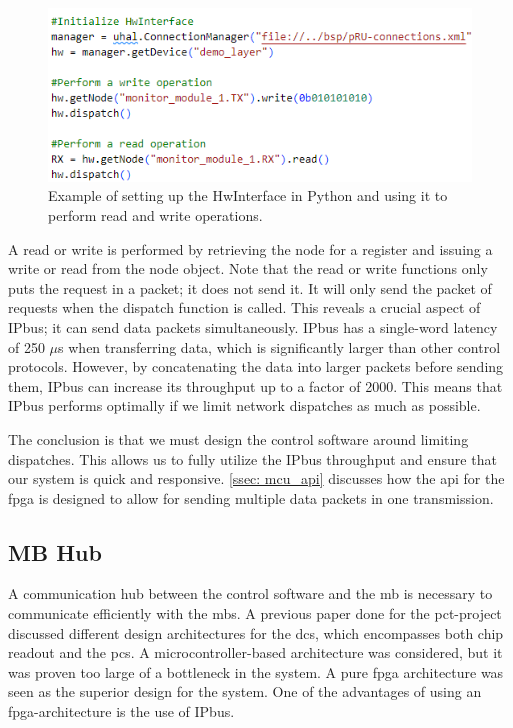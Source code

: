 \documentclass[main.tex]{subfiles}
\begin{document}
\begin{figure}[!htpb]
    \centering
    \includegraphics[scale=0.8]{images/HwInterface_example.png}
    \caption{Example of setting up the HwInterface in Python and using it to perform read and write operations.}
    \label{fig: hw_example}
\end{figure}
\FloatBarrier

A read or write is performed by retrieving the node for a register and issuing a write or read from the node object. Note that the read or write functions only puts the request in a packet; it does not send it. It will only send the packet of requests when the dispatch function is called. This reveals a crucial aspect of IPbus; it can send data packets simultaneously. IPbus has a single-word latency of 250 $\mu$s when transferring data, which is significantly larger than other control protocols. However, by concatenating the data into larger packets before sending them, IPbus can increase its throughput up to a factor of 2000\cite{IPbus}. This means that IPbus performs optimally if we limit network dispatches as much as possible.

The conclusion is that we must design the control software around limiting dispatches. This allows us to fully utilize the IPbus throughput and ensure that our system is quick and responsive. \autoref{ssec: mcu_api} discusses how the \gls{api} for the \gls{fpga} is designed to allow for sending multiple data packets in one transmission.


\subsection{MB Hub}
\label{section: fpga_design}
A communication hub between the control software and the \gls{mb} is necessary to communicate efficiently with the \gls{mb}s. A previous paper done for the \gls{pct}-project discussed different design architectures for the \gls{dcs}, which encompasses both chip readout and the \gls{pcs}\cite{ola}. A microcontroller-based architecture was considered, but it was proven too large of a bottleneck in the system. A pure \gls{fpga} architecture was seen as the superior design for the system. One of the advantages of using an \gls{fpga}-architecture is the use of IPbus.
\end{document}
